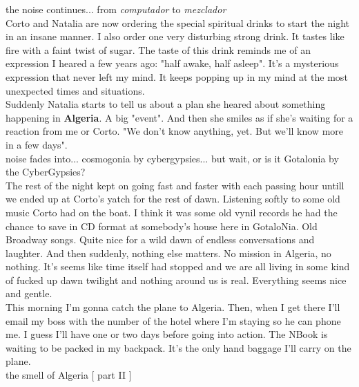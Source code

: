 \documentclass[11pt,twoside,a4paper]{book}
\begin{document}
\begin{multicols*}{2}

    {\small the noise continues... from \emph{computador} to \emph{mezclador} } ~\\

    Corto and Natalia are now ordering the special spiritual drinks to start the night in an insane manner. I also order one very disturbing strong drink. It tastes like fire with a faint twist of sugar. The taste of this drink reminds me of an expression I heared a few years ago: "half awake, half asleep". It's a mysterious expression that never left my mind. It keeps popping up in my mind at the most unexpected times and situations. ~\\

    Suddenly Natalia starts to tell us about a plan she heared about something happening in \textbf{Algeria}. A big "event". And then she smiles as if she's waiting for a reaction from me or Corto. "We don't know anything, yet. But we'll know more in a few days". ~\\

    {\small noise fades into... cosmogonia by cybergypsies... but wait, or is it Gotalonia by the CyberGypsies?} ~\\

    The rest of the night kept on going fast and faster with each passing hour untill we ended up at Corto's yatch for the rest of dawn. Listening softly to some old music Corto had on the boat. I think it was some old vynil records he had the chance to save in CD format at somebody's house here in GotaloNia. Old Broadway songs. Quite nice for a wild dawn of endless conversations and laughter. And then suddenly, nothing else matters. No mission in Algeria, no nothing. It's seems like time itself had stopped and we are all living in some kind of fucked up dawn twilight and nothing around us is real. Everything seems nice and gentle. ~\\

    This morning I'm gonna catch the plane to Algeria. Then, when I get there I'll email my boss with the number of the hotel where I'm staying so he can phone me. I guess I'll have one or two days before going into action. The NBook is waiting to be packed in my backpack. It's the only hand baggage I'll carry on the plane. ~\\


    {\small the smell of Algeria [ part II ]} ~\\


\end{multicols*}
\end{document}
